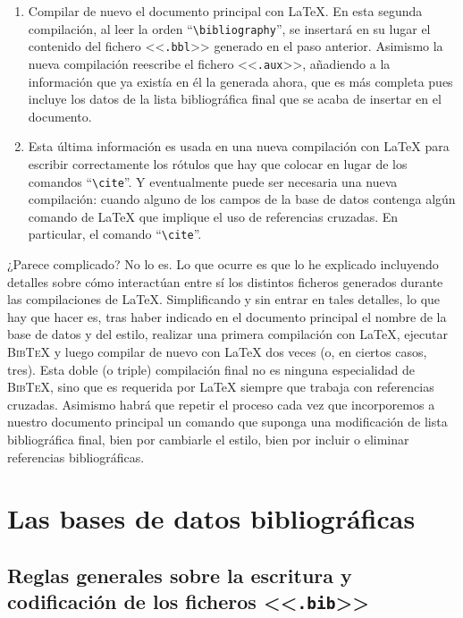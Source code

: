 \documentclass[a4paper,11pt]{article}
\def\btx-{\textsc{Bib\TeX}}
\def\ltx-{\LaTeX}
\def\ltr#1-{<<\texttt{#1}>>}
\def\tpf#1-{\ltr.#1-}
\def\cmd#1-{``\texttt{\textbackslash#1}''}
\begin{document}
\begin{enumerate}[1º]
\item  Compilar de nuevo  el documento  principal con  \ltx-. En  esta segunda
  compilación, al leer  la orden \cmd bibliography-, se  insertará en su lugar
  el contenido del fichero \tpf bbl- generado en el paso anterior. Asimismo la
  nueva compilación reescribe el fichero \tpf aux-, añadiendo a la información
  que ya existía en él la generada ahora, que es más completa pues incluye los
  datos  de la  lista  bibliográfica final  que  se acaba  de  insertar en  el
  documento.

\item Esta última información es usada en una nueva compilación con \ltx- para
  escribir  correctamente los  rótulos que  hay que  colocar en  lugar  de los
  comandos  \cmd  cite-.   Y  eventualmente  puede  ser  necesaria  una  nueva
  compilación: cuando alguno de los campos  de la base de datos contenga algún
  comando de \ltx- que implique el uso de referencias cruzadas. En particular,
  el comando \cmd cite-.

\end{enumerate}

¿Parece complicado? No lo es. Lo  que ocurre es que lo he explicado incluyendo
detalles  sobre cómo  interactúan entre  sí los  distintos  ficheros generados
durante  las compilaciones  de \ltx-.   Simplificando  y sin  entrar en  tales
detalles,  lo que  hay  que hacer  es,  tras haber  indicado  en el  documento
principal el  nombre de la  base de datos  y del estilo, realizar  una primera
compilación con \ltx-, ejecutar \btx- y  luego compilar de nuevo con \ltx- dos
veces (o, en ciertos casos, tres).  Esta doble (o triple) compilación final no
es ninguna especialidad de \btx-, sino  que es requerida por \ltx- siempre que
trabaja con referencias cruzadas.  Asimismo  habrá que repetir el proceso cada
vez que incorporemos a nuestro  documento principal un comando que suponga una
modificación de lista bibliográfica final,  bien por cambiarle el estilo, bien
por incluir o eliminar referencias bibliográficas.

\section{Las bases de datos bibliográficas}
\label{sec:las-bases-de}

\subsection{Reglas generales sobre la escritura y codificación de los ficheros
  \tpf bib-}
\label{sec:ficheros-.bib-1}
\end{document}

